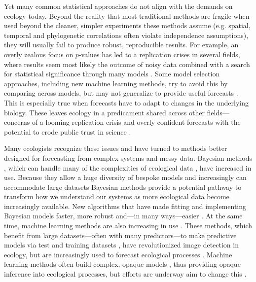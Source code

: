 \documentclass[11pt]{article}
\begin{document}
Yet many common statistical approaches do not align with the demands on ecology today. Beyond the reality that most traditional methods are fragile when used beyond the cleaner, simpler experiments these methods assume (e.g. spatial, temporal and phylogenetic correlations often violate independence assumptions), they will usually fail to produce robust, reproducible results. For example, an overly zealous focus on $p$-values has led to a replication crises in several fields, where results seem most likely the outcome of noisy data combined with a search for statistical significance through many models \citep[effectively a garden of forking paths,][]{halsey2015,loken2017}. Some model selection approaches, including new machine learning methods, try to avoid this by comparing across models, but may not generalize to provide useful forecasts \citep{boettiger2022forecast}. This is especially true when forecasts have to adapt to changes in the underlying biology. These leaves ecology in a predicament shared across other fields---concerns of a looming replication crisis \citep{filazzola2021replication,fraser2020role} and overly confident forecasts with the potential to erode public trust in science \citep{leroux2019prevalence,boettiger2022forecast}. 

Many ecologists recognize these issues and have turned to methods better designed for forecasting from complex systems and messy data. Bayesian methods \citep{anderson2021trends}, which can handle many of the complexities of ecological data \citep{hobbs2006alternatives}, have increased in use. Because they allow a huge diversity of bespoke models and increasingly can accommodate large datasets Bayesian methods provide a potential pathway to transform how we understand our systems as more ecological data become increasingly available. New algorithms \citep[e.g. Hamiltonian Monte Carlo,][]{nuts2014,betan2019} that have made fitting and implementing Bayesian models faster, more robust and---in many ways---easier \citep{Carpenter:2017stan}. At the same time, machine learning methods are also increasing in use \citep{pichler2023machine}. These methods, which benefit from large datasets---often with many predictors---to make predictive models via test and training datasets \citep{breiman2001statistical}, have revolutionized image detection in ecology, but are increasingly used to forecast ecological processes \citep[e.g.,][]{zwart2023near}. Machine learning methods often build complex, opaque models \citep{breiman2001statistical,shmueli2010explain}, thus providing opaque inference into ecological processes, but efforts are underway aim to change this \citep[e.g.,][]{kutz2023machine}. 
\end{document}
